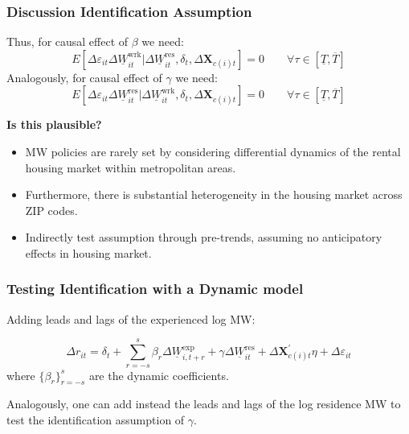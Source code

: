 \documentclass[aspectratio=169, t]{beamer}
\newcommand{\MW}{\underline{W}}
\begin{document}
\begin{frame}
    \frametitle{Discussion Identification Assumption}
    
    Thus, for causal effect of $\beta$ we need:
    $$
    E \left[\Delta \varepsilon_{it} \Delta \MW^{\text{wrk}}_{it}  
    \big| \Delta \MW^{\text{res}}_{it}, \delta_t, \Delta 
    \mathbf{X}_{c(i)t} \right] = 0
    \quad \quad \forall \tau \in \left[ \underline{T}, \overline{T} \right]
    $$
    \vspace{.5mm}
    Analogously, for causal effect of $\gamma$ we need:
    $$
    E \left[\Delta \varepsilon_{it} \Delta \MW^{\text{res}}_{it}  
    \big| \Delta \MW^{\text{wrk}}_{it}, \delta_t, \Delta \mathbf{X}_{c(i)t} 
    \right] = 0
    \quad \quad \forall \tau \in \left[ \underline{T}, \overline{T} \right]
    $$
    
    \pause
    \vspace{.5mm}
    \textbf{Is this plausible?}
    \begin{itemize} \small
        \vspace{.5mm}
        \item MW policies are rarely set by considering differential dynamics of the 
        rental housing market within metropolitan areas.
        
        \vspace{.5mm}
        \item Furthermore, there is substantial heterogeneity in the housing market 
        across ZIP codes.
        
        \vspace{.5mm}
        \item Indirectly test assumption through pre-trends, assuming no anticipatory 
        effects in housing market.
    \end{itemize}
\end{frame}


\begin{frame}[label = dyn_model]
    \frametitle{Testing Identification with a Dynamic model}
    
    Adding leads and lags of the experienced log MW:
    
    $$
    \Delta r_{it} = \delta_t
        + \sum_{r=-s}^{s} \beta_r \Delta \MW^{\text{exp}}_{i,t+r}
        + \gamma \Delta \MW^{\text{res}}_{it}
        + \Delta \mathbf{X}^{'}_{c(i)t}\eta
        + \Delta \varepsilon_{it}
    $$    
    where $\{\beta_r\}_{r=-s}^{s}$ are the dynamic coefficients.
    
    \vspace{3mm}

    Analogously, one can add instead the leads and lags of the log residence MW
    to test the identification assumption of $\gamma$.
\end{frame}
\end{document}
